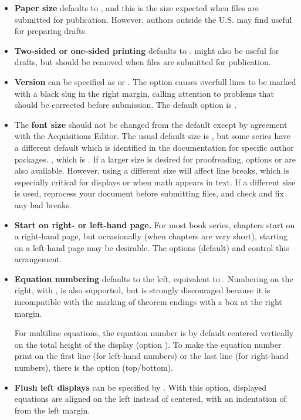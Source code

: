 \begin{itemize}

\item \textbf{Paper size} defaults to , and this
 is the size expected when files are submitted for publication.
 However, authors outside the U.S. may find  useful
 for preparing drafts.

\item \textbf{Two-sided or one-sided printing} defaults to
.   might also be useful for drafts,
 but should be removed when files are submitted for publication.

\item \textbf{Version} can be specified as  or .
 The  option causes overfull lines to be marked with a black
 slug  in the right margin, calling attention to problems that should be
 corrected before submission. The default option is .


\item The \textbf{font size} should not be changed from the default
\ifmonograph
 except by agreement with the Acquisitions Editor.  The usual default
 size is \opt{10pt}, but some series have a different default which is
 identified in the documentation for specific author packages.
\else \unskip, which is \opt{10pt}.
\fi
 If a larger size is desired for proofreading, options \opt{11pt} or
 \opt{12pt} are also available.  However, using a different size will
 affect line breaks, which is especially critical for displays or when
 math appears in text.  If a different size is used, reprocess your
 document before submitting files, and check and fix any bad breaks.

\ifmonograph
\item \textbf{Start on right- or left-hand page.}
 For most book series, chapters start on a right-hand page,
 but occasionally (when chapters are very short), starting on a
 left-hand page may be desirable.  The options  (default)
 and  control this arrangement.
\fi

\item \textbf{Equation numbering} defaults to the left, equivalent to
 .
 Numbering on the right, with , is also supported, but is
 strongly discouraged because it is incompatible with the marking of
 theorem endings with a  box at the right margin.

 For multiline equations, the equation number is by default centered
 vertically on the total height of the display (option ).
 To make the equation number print on the first line (for left-hand
 numbers) or the last  line (for right-hand numbers), there is the
 option  (top/bottom).

\item \textbf{Flush left displays} can be specified by .
 With this option, displayed equations are aligned on the left
 instead of centered, with an indentation of  from
 the left margin.

\end{itemize}

